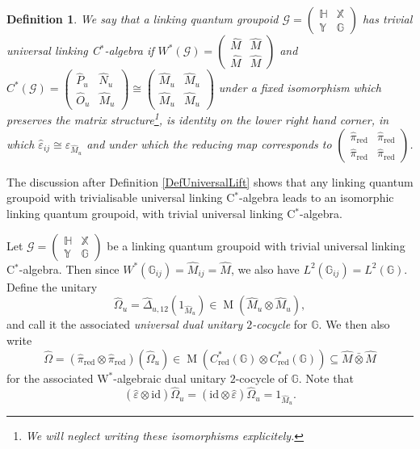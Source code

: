 \documentclass[reqno]{amsart}
\numberwithin{equation}{section}
\newtheorem{Def}[Theorem]{Definition}
\newcommand{\id}{\mathrm{id}}
\newcommand{\G}{\mathbb{G}}
\newcommand{\Hh}{\mathbb{H}}
\newcommand{\X}{\mathbb{X}}
\newcommand{\Y}{\mathbb{Y}}
\newcommand{\msG}{\mathscr{G}}
\newcommand{\red}{\mathrm{red}}
\newcommand{\Mult}{\operatorname{M}}
\begin{document}
\begin{Def}\label{def3}
We say that a linking quantum groupoid $\msG= \begin{pmatrix} \Hh & \X\\ \Y & \G\end{pmatrix}$ has \emph{trivial universal linking C$^*$-algebra} if $
W^*(\msG)=\begin{pmatrix} \hat{M}& \hat{M}\\ \hat{M}&\hat{M}\end{pmatrix}$ and $ C^*(\msG)=\begin{pmatrix}
\hat{P}_u & \hat{N}_u \\ \hat{O}_u & \hat{M}_u
\end{pmatrix}\cong \begin{pmatrix} \hat{M}_u& \hat{M}_u\\ \hat{M}_u&\hat{M}_u\end{pmatrix}$ under a fixed isomorphism which preserves the matrix structure\footnote{We will neglect writing these isomorphisms explicitely.}, is identity on the lower right hand corner, in which $ \hat{\varepsilon}_{ij}\cong\varepsilon_{\hat{M}_u}$
 and under which the reducing map corresponds to $\begin{pmatrix}
\hat{\pi}_{\red} & \hat{\pi}_{\red} \\
\hat{\pi}_{\red} & \hat{\pi}_{\red}
\end{pmatrix}$.
\end{Def}

The discussion after Definition \ref{DefUniversalLift} shows that any linking quantum groupoid with trivialisable universal linking C$^*$-algebra leads to an isomorphic linking quantum groupoid, with trivial universal linking C$^*$-algebra.

Let $\msG= \begin{pmatrix} \Hh & \X\\ \Y & \G\end{pmatrix}$ be a linking quantum groupoid with trivial universal linking C$^*$-algebra. Then since $W^*(\G_{ij})=\hat{M}_{ij}=\hat{M}$, we also have $L^2(\G_{ij})=L^2(\G)$. Define the unitary
\[
\hat{\Omega}_u = \hat{\Delta}_{u,12}(1_{\hat{M}_u})\in \Mult(\hat{M}_u \otimes \hat{M}_u),
\]
and call it the associated \emph{universal dual unitary $2$-cocycle} for $\G$. We then also write 
\begin{equation}\label{eq10}
\hat{\Omega} = (\hat{\pi}_{\red}\otimes \hat{\pi}_{\red})(\hat{\Omega}_u) \in \Mult(C_{\red}^*(\G) \otimes C_{\red}^*(\G))\subseteq \hat{M}\bar{\otimes}\hat{M}
\end{equation}
for the associated W$^*$-algebraic dual unitary $2$-cocycle of $\G$. Note that
\[
(\hat{\varepsilon}\otimes \id)\hat{\Omega}_u = (\id\otimes \hat{\varepsilon})\hat{\Omega}_u = 1_{\hat{M}_u}. 
\] 
\end{document}
